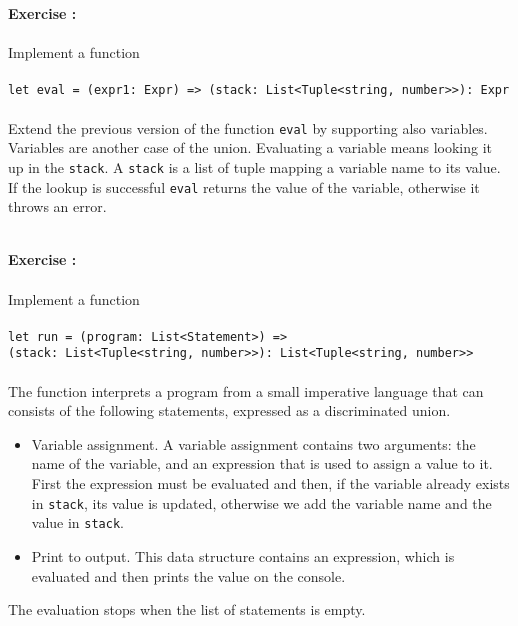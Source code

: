 \documentclass[]{article}
\newcounter{ExerciseCount}
\newcommand{\functionEx}[3]{
  Implement a function\\\\
   \texttt{let #1 = #2}\\\\ #3
}
\newcommand{\exercise}[1]{\noindent \textbf{Exercise \theExerciseCount:}\\\\ #1 \addtocounter{ExerciseCount}{1}
}
\begin{document}
\exercise{
  \functionEx{eval}{(expr1: Expr) => (stack: List<Tuple<string, number>>): Expr}{
  Extend the previous version of the function \texttt{eval} by supporting also variables. Variables are another case of the union. Evaluating a variable means looking it up in the \texttt{stack}. A \texttt{stack} is a list of tuple mapping a variable name to its value. If the lookup is successful \texttt{eval} returns the value of the variable, otherwise it throws an error.
}}\\

\exercise{
  \functionEx{run}{(program: List<Statement>) =>\\ (stack: List<Tuple<string, number>>): List<Tuple<string, number>>}{
  The function interprets a program from a small imperative language that can consists of the following statements, expressed as a discriminated union.
  
  \begin{itemize}[noitemsep]
  \item Variable assignment. A variable assignment contains two arguments: the name of the variable, and an expression that is used to assign a value to it. First the expression must be evaluated and then, if the variable already exists in \texttt{stack}, its value is updated, otherwise we add the variable name and the value in \texttt{stack}.
  \item Print to output. This data structure contains an expression, which is evaluated and then prints the value on the console.
  \end{itemize}
  
  The evaluation stops when the list of statements is empty.
}}\\
\end{document}
